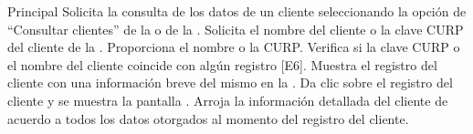 	\begin{UCtrayectoria}{Principal}
		\UCpaso[\UCactor] Solicita la consulta de los datos de un cliente seleccionando la opción de ``Consultar clientes'' de la  o de la  .
		\UCpaso Solicita el nombre del cliente o la clave CURP del cliente de la .
		\UCpaso[\UCactor] Proporciona el nombre o la CURP.
		\UCpaso Verifica si la clave CURP o el nombre del cliente coincide con algún registro [E6].
		\UCpaso Muestra el registro del cliente con una información breve del mismo en la .
		\UCpaso[\UCactor] Da clic sobre el registro del cliente y se muestra la pantalla .
		\UCpaso Arroja la información detallada del cliente de acuerdo a todos los datos otorgados al momento del registro del cliente.
		
	\end{UCtrayectoria}